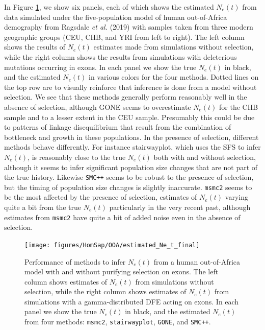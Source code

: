 \documentclass[hidelinks]{article}
\newcommand{\msmc}{\texttt{msmc2}\xspace}
\newcommand{\stairway}{\texttt{stairwayplot}\xspace}
\newcommand{\gone}{\texttt{GONE}\xspace}
\newcommand{\smcpp}{\texttt{SMC++}\xspace}
\begin{document}
    In Figure \ref{fig:1pop-human-demography}, we show six panels, each of which shows the estimated $N_e(t)$
    from data simulated under the five-population model of human out-of-Africa demography
    from Ragsdale \textit{et al.} (2019)
    with samples taken from three modern geographic groups (CEU, CHB, and YRI from left to right).
    The left column shows the results of $N_e(t)$ estimates made from simulations without selection, 
    while the right column shows the results
    from simulations with deleterious mutations occurring in exons.
    In each panel we show the true $N_e(t)$ in black, and the estimated $N_e(t)$
    in various colors for the four methods. Dotted lines on the top row are to visually reinforce that inference is done
    from a model without selection. We see that these methods generally perform reasonably well in the absence of selection, 
    although GONE seems to overestimate $N_e(t)$ for the CHB sample and to a lesser extent in the CEU sample.
    Presumably this could be due to patterns of linkage disequilibrium that result from the combination
    of bottleneck and growth in these populations.
    In the presence of selection, different methods behave differently. 
    For instance stairwayplot, which uses the SFS to infer $N_e(t)$, 
    is reasonably close to the true $N_e(t)$ both with and without selection,
    although it seems to infer significant population size changes that are not part of the true history.
    Likewise \smcpp seems to be robust to the presence of selection,
    but the timing of population size changes is slightly inaccurate. 
    \msmc seems to be the most affected by the presence of selection, 
    estimates of $N_e(t)$ varying quite a bit from the true $N_e(t)$ particularly in the very recent past,
    although estimates from \msmc have quite a bit of added noise even in the absence of selection.



    \begin{figure}[t]
        \centering
        \texttt{[image: figures/HomSap/OOA/estimated\_Ne\_t\_final]}
        \caption{
        \label{fig:1pop-human-demography}
        Performance of methods to infer $N_e(t)$ from a human out-of-Africa model \citep{ragsdale2019models}
        with and without purifying selection on exons. The left column shows estimates of $N_e(t)$ from simulations
        without selection, while the right column shows estimates of $N_e(t)$ from simulations with a gamma-distributed   
        DFE acting on exons. In each panel we show the true $N_e(t)$ in black, and the estimated $N_e(t)$ from four methods:    
        \msmc \citep{Schiffels2020}, \stairway \citep{liu2020stairway}, \gone \citep{santiago2020recent}, and \smcpp \citep{terhorst2017robust}.  
        }
    \end{figure}
\end{document}
